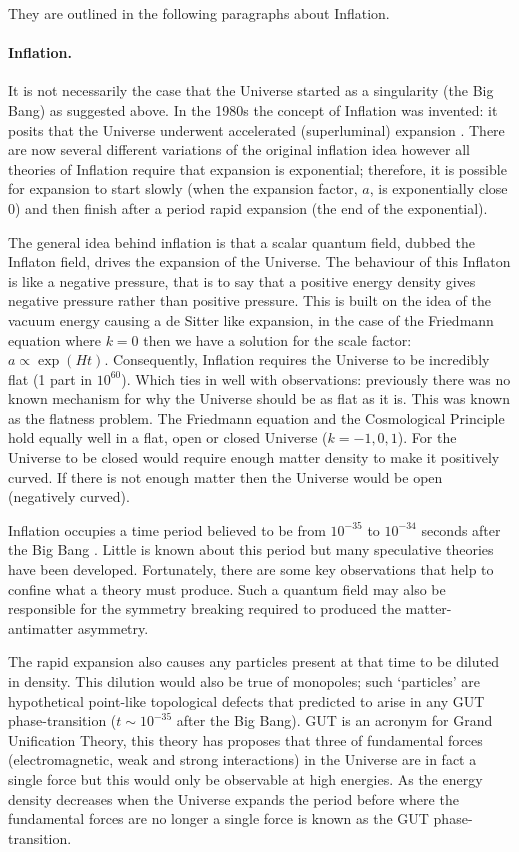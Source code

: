 \noindent They are outlined in the following paragraphs about Inflation.

\paragraph{Inflation.}
It is not necessarily the case that the Universe started as a singularity (the Big Bang) as suggested above. In the 1980s the concept of Inflation was invented: it posits that the Universe underwent accelerated (superluminal) expansion \citep{bib_baum}. There are now several different variations of the original inflation idea however all theories of Inflation require that expansion is exponential; therefore, it is possible for expansion to start slowly (when the expansion factor, $a$, is exponentially close 0) and then finish after a period rapid expansion (the end of the exponential). \citep{bib_pea}

The general idea behind inflation is that a scalar quantum field, dubbed the Inflaton field, drives the expansion of the Universe. The behaviour of this Inflaton is like a negative pressure, that is to say that a positive energy density gives negative pressure rather than positive pressure. This is built on the idea of the vacuum energy causing a de Sitter like expansion, in the case of the Friedmann equation where $k=0$ then we have a solution for the scale factor: $a \propto \exp(Ht)$. Consequently, Inflation requires the Universe to be incredibly flat (1 part in $10^{60}$). Which ties in well with observations: previously there was no known mechanism for why the Universe should be as flat as it is. This was known as the flatness problem. The Friedmann equation and the Cosmological Principle hold equally well in a flat, open or closed Universe ($k = -1, 0, 1 $). For the Universe to be closed would require enough matter density to make it positively curved. If there is not enough matter then the Universe would be open (negatively curved).

Inflation occupies a time period believed to be from $10^{-35}$ to $10^{-34}$ seconds after the Big Bang \citep{bib_pea}. Little is known about this period but many speculative theories have been developed. Fortunately, there are some key observations that help to confine what a theory must produce. Such a quantum field may also be responsible for the symmetry breaking required to produced the matter-antimatter asymmetry.

The rapid expansion also causes any particles present at that time to be diluted in density. This dilution would also be true of monopoles; such `particles' are hypothetical point-like topological defects that predicted to arise in any GUT phase-transition ($t\sim 10^{-35}$ after the Big Bang). GUT is an acronym for Grand Unification Theory, this theory has proposes that three of fundamental forces (electromagnetic, weak and strong interactions) in the Universe are in fact a single force but this would only be observable at high energies. As the energy density decreases when the Universe expands the period before where the fundamental forces are no longer a single force is known as the GUT phase-transition.

